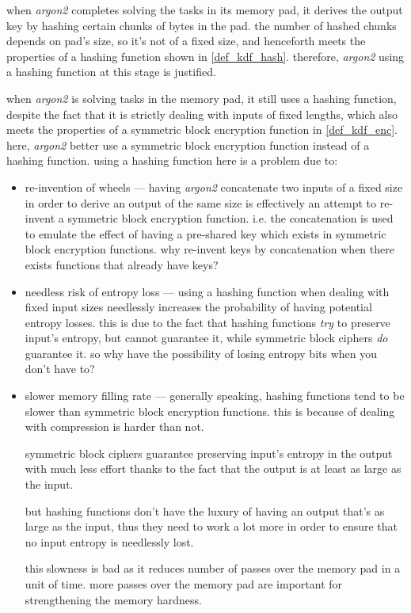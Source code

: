 \documentclass[twocolumn]{article}
\begin{document}
when \emph{argon2} completes solving the tasks in its memory pad, it
derives the output key by hashing certain chunks of bytes in the pad.  the
number of hashed chunks depends on pad's size, so it's not of a fixed size,
and henceforth meets the properties of a hashing function shown in
\cref{def_kdf_hash}.  therefore, \emph{argon2} using a hashing function at
this stage is justified.

when \emph{argon2} is solving tasks in the memory pad, it still uses a
hashing function, despite the fact that it is strictly dealing with inputs
of fixed lengths, which also meets the properties of a symmetric block
encryption function in \cref{def_kdf_enc}.  here, \emph{argon2} better use
a symmetric block encryption function instead of a hashing function.  using
a hashing function here is a problem due to:
\begin{itemize}
    \item re-invention of wheels --- having \emph{argon2} concatenate two
    inputs of a fixed size in order to derive an output of the same size is
    effectively an attempt to re-invent a symmetric block encryption
    function.  i.e. the concatenation is used to emulate the effect of
    having a pre-shared key which exists in symmetric block encryption
    functions.  why re-invent keys by concatenation when there exists
    functions that already have keys?

    \item needless risk of entropy loss --- using a hashing function when
    dealing with fixed input sizes needlessly increases the probability of
    having potential entropy losses.  this is due to the fact that hashing
    functions \emph{try} to preserve input's entropy, but cannot guarantee
    it, while symmetric block ciphers \emph{do} guarantee it.  so why have
    the possibility of losing entropy bits when you don't have to?

    \item slower memory filling rate --- generally speaking, hashing
    functions tend to be slower than symmetric block encryption functions.
    this is because of dealing with compression is harder than not.

    symmetric block ciphers guarantee preserving input's entropy in the
    output with much less effort thanks to the fact that the output is at
    least as large as the input.

    but hashing functions don't have the luxury of having an output that's
    as large as the input, thus they need to work a lot more in order to
    ensure that no input entropy is needlessly lost.

    this slowness is bad as it reduces number of passes over the memory pad in
    a unit of time.  more passes over the memory pad are important for
    strengthening the memory hardness.
\end{itemize}
\end{document}
